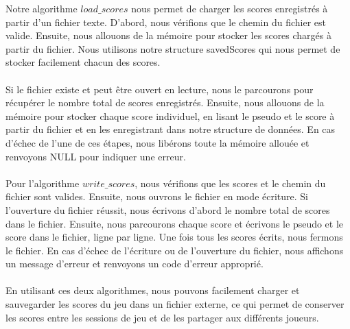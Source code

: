 Notre algorithme $load\_scores$ nous permet de charger les scores enregistrés à partir d'un fichier texte. D'abord, nous vérifions que le chemin du fichier est valide. Ensuite, nous allouons de la mémoire pour stocker les scores chargés à partir du fichier. Nous utilisons notre structure savedScores qui nous permet de stocker facilement chacun des scores. 
\\\\
Si le fichier existe et peut être ouvert en lecture, nous le parcourons pour récupérer le nombre total de scores enregistrés. Ensuite, nous allouons de la mémoire pour stocker chaque score individuel, en lisant le pseudo et le score à partir du fichier et en les enregistrant dans notre structure de données. En cas d'échec de l'une de ces étapes, nous libérons toute la mémoire allouée et renvoyons NULL pour indiquer une erreur.
\\\\
Pour l'algorithme $write\_scores$, nous vérifions que les scores et le chemin du fichier sont valides. Ensuite, nous ouvrons le fichier en mode écriture. Si l'ouverture du fichier réussit, nous écrivons d'abord le nombre total de scores dans le fichier. Ensuite, nous parcourons chaque score et écrivons le pseudo et le score dans le fichier, ligne par ligne. Une fois tous les scores écrits, nous fermons le fichier. En cas d'échec de l'écriture ou de l'ouverture du fichier, nous affichons un message d'erreur et renvoyons un code d'erreur approprié.
\\\\
En utilisant ces deux algorithmes, nous pouvons facilement charger et sauvegarder les scores du jeu dans un fichier externe, ce qui permet de conserver les scores entre les sessions de jeu et de les partager aux différents joueurs.

